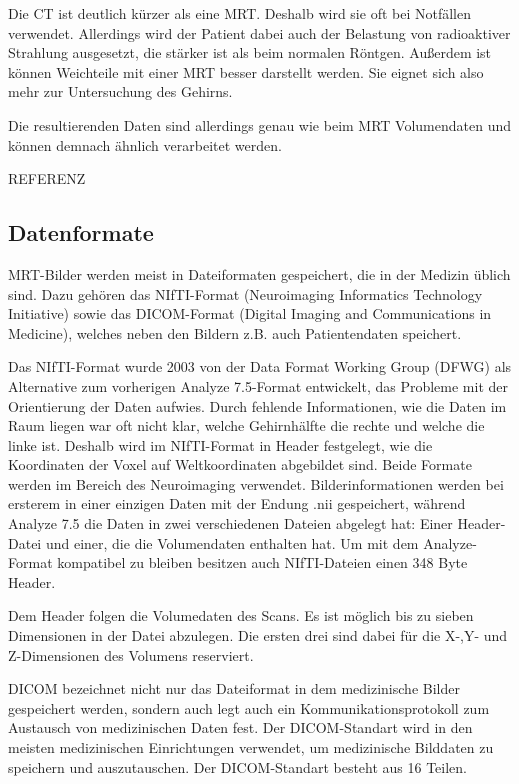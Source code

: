 Die CT ist deutlich kürzer als eine MRT. Deshalb wird sie oft bei Notfällen verwendet. Allerdings wird der Patient dabei auch der Belastung von radioaktiver Strahlung ausgesetzt, die stärker ist als beim normalen Röntgen. Außerdem ist können Weichteile mit einer MRT besser darstellt werden. Sie eignet sich also mehr zur Untersuchung des Gehirns.

Die resultierenden Daten sind allerdings genau wie beim MRT Volumendaten und können demnach ähnlich verarbeitet werden.

REFERENZ

\subsection{Datenformate}

MRT-Bilder werden meist in Dateiformaten gespeichert, die in der Medizin üblich sind. Dazu gehören das NIfTI-Format (Neuroimaging Informatics Technology Initiative) sowie das DICOM-Format (Digital Imaging and Communications in Medicine), welches neben den Bildern z.B. auch Patientendaten speichert.

Das NIfTI-Format wurde 2003 von der Data Format Working Group (DFWG) als Alternative zum vorherigen Analyze 7.5-Format entwickelt, das Probleme mit der Orientierung der Daten aufwies. Durch fehlende Informationen, wie die Daten im Raum liegen war oft nicht klar, welche Gehirnhälfte die rechte und welche die linke ist. Deshalb wird im NIfTI-Format in Header festgelegt, wie die Koordinaten der Voxel auf Weltkoordinaten abgebildet sind. Beide Formate werden im Bereich des Neuroimaging verwendet.
Bilderinformationen werden bei ersterem in einer einzigen Daten mit der Endung .nii gespeichert, während Analyze 7.5 die Daten in zwei verschiedenen Dateien abgelegt hat: Einer Header-Datei und einer, die die Volumendaten enthalten hat. Um mit dem Analyze-Format kompatibel zu bleiben besitzen auch NIfTI-Dateien einen 348 Byte Header.
 
Dem Header folgen die Volumedaten des Scans. Es ist möglich bis zu sieben Dimensionen in der Datei abzulegen. Die ersten drei sind dabei für die X-,Y- und Z-Dimensionen des Volumens reserviert.

DICOM bezeichnet nicht nur das Dateiformat in dem medizinische Bilder gespeichert werden, sondern auch legt auch ein Kommunikationsprotokoll zum Austausch von medizinischen Daten fest. Der DICOM-Standart wird in den meisten medizinischen Einrichtungen verwendet, um medizinische Bilddaten zu speichern und auszutauschen.
Der DICOM-Standart besteht aus 16 Teilen.

